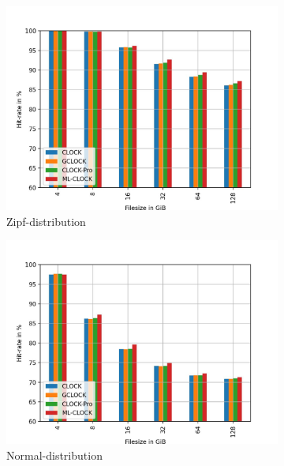 \documentclass[
	12pt,
	a4paper,
	abstract,
	bibliography=totoc,
	chapterprefix,
	headings=openright,
	numbers=endperiod,
	parskip=half,
	twoside,
]{scrreprt}
\begin{document}
\begin{figure}[H]
	\centering
	\begin{subfigure}{0.4\textwidth}
		\includegraphics[width=\textwidth]{rw_50to50_zipf.jpg}		
		\caption{Zipf-distribution}
		\label{fig:rw_90to10  zipf}
	\end{subfigure}
	\hfill
	\begin{subfigure}{0.4\textwidth}
		\includegraphics[width=\textwidth]{rw_50to50_normal.jpg}		
		\caption{Normal-distribution}
		\label{fig:rw_90to10  normal}
	\end{subfigure}
	\hfill
	\begin{subfigure}{0.4\textwidth}

\end{subfigure}
\end{figure}
\end{document}
